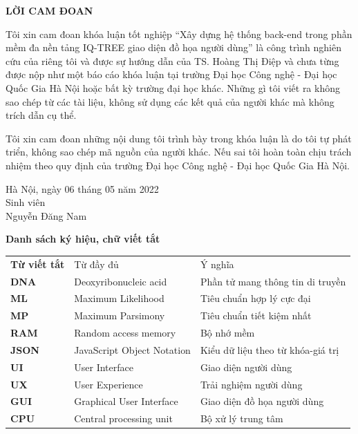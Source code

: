 \documentclass[12pt]{report}
\begin{document}
\newpage
\begin{center}
	\textbf{\large LỜI CAM ĐOAN}
\end{center}

Tôi xin cam đoan khóa luận tốt nghiệp “Xây dựng hệ thống back-end trong phần mềm đa nền tảng IQ-TREE giao diện đồ họa người dùng” là công trình nghiên cứu của riêng tôi và được sự hướng dẫn của TS. Hoàng Thị Điệp và chưa từng được nộp như một báo cáo khóa luận tại trường Đại học Công nghệ - Đại học Quốc Gia Hà Nội hoặc bất kỳ trường đại học khác. Những gì tôi viết ra không sao chép từ các tài liệu, không sử dụng các kết quả của người khác mà không trích dẫn cụ thể.

Tôi xin cam đoan những nội dung tôi trình bày trong khóa luận là do tôi tự phát triển, không sao chép mã nguồn của người khác. Nếu sai tôi hoàn toàn chịu trách nhiệm theo quy định của trường Đại học Công nghệ - Đại học Quốc Gia Hà Nội.

\begin{flushright}
	\begin{varwidth}{\linewidth}\centering
		Hà Nội, ngày 06 tháng 05 năm 2022\\
		Sinh viên\\[2cm]
		Nguyễn Đăng Nam
	\end{varwidth}
\end{flushright}

\newpage
\tableofcontents

\newpage
{}
\listoftables

\newpage
{}
\begin{flushleft}
\bfseries{\Huge{Danh sách ký hiệu, chữ viết tắt}}
\end{flushleft}
\begin{table}[h]
	\centering
	\begin{tabular}{lll}
	    \textbf{Từ viết tắt}  & Từ đầy đủ & Ý nghĩa \\[0.3cm]
		\textbf{DNA}  & Deoxyribonucleic acid & Phần tử mang thông tin di truyền \\[0.3cm]
		\textbf{ML}  & Maximum Likelihood  & Tiêu chuẩn hợp lý cực đại \\[0.3cm]
		\textbf{MP}  & Maximum Parsimony & Tiêu chuẩn tiết kiệm nhất \\[0.3cm]
		\textbf{RAM}  & Random access memory & Bộ nhớ mềm \\[0.3cm]
		\textbf{JSON}  & JavaScript Object Notation & Kiểu dữ liệu theo từ khóa-giá trị \\[0.3cm]
		\textbf{UI}  & User Interface  & Giao diện người dùng \\[0.3cm]
		\textbf{UX}  & User Experience  & Trải nghiệm người dùng \\[0.3cm]
		\textbf{GUI}  & Graphical User Interface & Giao diện đồ họa người dùng \\[0.3cm]
		\textbf{CPU}  & Central processing unit & Bộ xử lý trung tâm \\[0.3cm]
	\end{tabular}
\end{table}
\end{document}
